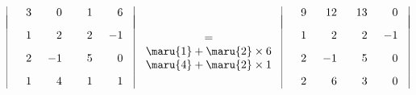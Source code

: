 \documentclass[a4paper,10pt,onecolumn,oneside,notitlepage,final]{jsarticle} %
\begin{document}
$\begin{array}{|rrrr@{\quad}|}
\hspace{6mm}&\hspace{6mm}&\hspace{6mm}&\hspace{6mm}\\[-7mm]
   3&   0&   1&   6\\[3mm]
   1&   2&   2&  -1\\[3mm]
   2&  -1&   5&   0\\[3mm]
   1&   4&   1&   1\\
\end{array}$
$\begin{array}{ll}
\hfill = \hfill\\
\maru{1}+\maru{2}\times 6\\
\maru{4}+\maru{2}\times 1\\
\end{array}$
$\begin{array}{|rrrr@{\quad}|}
\hspace{6mm}&\hspace{6mm}&\hspace{6mm}&\hspace{6mm}\\[-7mm]
   9&  12&  13&   0\\[3mm]
   1&   2&   2&  -1\\[3mm]
   2&  -1&   5&   0\\[3mm]
   2&   6&   3&   0\\
\end{array}$
\end{document}
